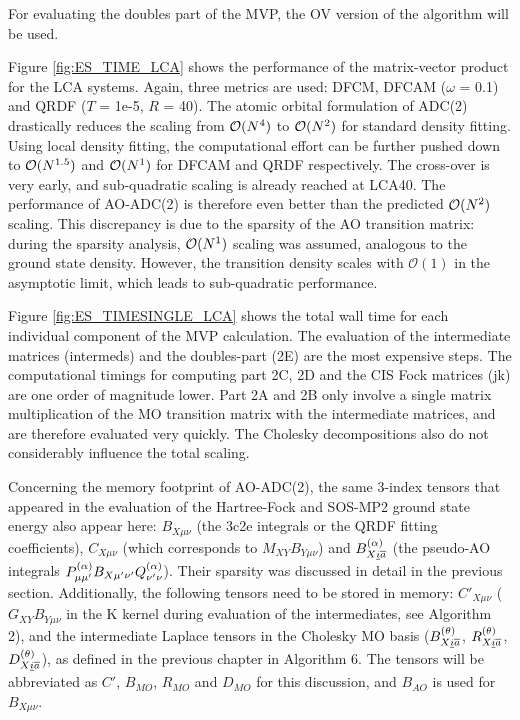 For evaluating the doubles part of the MVP, the OV version of the algorithm will be used.

Figure \ref{fig:ES_TIME_LCA} shows the performance of the matrix-vector product for the LCA systems. Again, three metrics are used: DFCM, DFCAM ($\omega$ = 0.1) and QRDF ($T$ = 1e-5, $R$ = 40). The atomic orbital formulation of ADC(2) drastically reduces the scaling from $\mathcal{O}(N^{4})$ to $\mathcal{O}(N^{2})$ for standard density fitting. Using local density fitting, the computational effort can be further pushed down to $\mathcal{O}(N^{1.5})$ and $\mathcal{O}(N^{1})$ for DFCAM and QRDF respectively. The cross-over is very early, and sub-quadratic scaling is already reached at LCA40. The performance of AO-ADC(2) is therefore even better than the predicted $\mathcal{O}(N^{2})$ scaling. This discrepancy is due to the sparsity of the AO transition matrix: during the sparsity analysis, $\mathcal{O}(N^{1})$ scaling was assumed, analogous to the ground state density. However, the transition density scales with $\mathcal{O}(1)$ in the asymptotic limit, which leads to sub-quadratic performance.

Figure \ref{fig:ES_TIMESINGLE_LCA} shows the total wall time for each individual component of the MVP calculation. The evaluation of the intermediate matrices (intermeds) and the doubles-part (2E) are the most expensive steps. The computational timings for computing part 2C, 2D and the CIS Fock matrices (jk) are one order of magnitude lower. Part 2A and 2B only involve a single matrix multiplication of the MO transition matrix with the intermediate matrices, and are therefore evaluated very quickly. The Cholesky decompositions also do not considerably influence the total scaling. 

Concerning the memory footprint of AO-ADC(2), the same 3-index tensors that appeared in the evaluation of the Hartree-Fock and SOS-MP2 ground state energy also appear here: $B_{X\mu\nu}$ (the 3c2e integrals or the QRDF fitting coefficients), $C_{X\mu\nu}$ (which corresponds to $M_{XY}B_{Y\mu\nu}$) and $B^{(\alpha)}_{X\underline{i}\overline{a}}$ (the pseudo-AO integrals $P^{(\alpha)}_{\mu\mu'} B_{X\mu'\nu'} Q^{(\alpha)}_{\nu'\nu}$). Their sparsity was discussed in detail in the previous section. Additionally, the following tensors need to be stored in memory: $C'_{X\mu\nu}$ ($G_{XY}B_{Y\mu\nu}$ in the K kernel during evaluation of the intermediates, see Algorithm 2), and the intermediate Laplace tensors in the Cholesky MO basis ($B^{(\theta)}_{X\underline{i}\overline{a}}$, $R^{(\theta)}_{X\underline{i}\overline{a}}$, $D^{(\theta)}_{X\underline{i}\overline{a}}$), as defined in the previous chapter in Algorithm 6. The tensors will be abbreviated as $C'$, $B_{MO}$, $R_{MO}$ and $D_{MO}$ for this discussion, and $B_{AO}$ is used for $B_{X\mu\nu}$.

